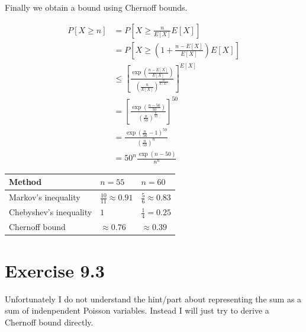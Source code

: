 \documentclass[10pt,a4paper]{article}
\begin{document}
Finally we obtain a bound using Chernoff bounds.

\begin{align*}
  P[X \ge n] & = P[X \ge \frac{n}{E[X]}E[X]]\\
             & = P[X \ge \left( 1 + \frac{n - E[X]}{E[X]} \right)E[X]]\\
             & \le \left[ \frac{\exp\left( \frac{n - E[X]}{E[X]} \right)}{\left( \frac{n}{E[X]} \right)^{\frac{n}{E[X]}}} \right]^{E[X]}\\
             & = \left[ \frac{\exp\left( \frac{n - 50}{50} \right)}{\left( \frac{n}{50} \right)^{\frac{n}{50}}} \right]^{50}\\
             & = \frac{\exp\left( \frac{n}{50} - 1 \right)^{50}}{\left( \frac{n}{50} \right)^{n}}\\
             & = 50^{n} \frac{\exp\left( n - 50 \right)}{n^{n}}
\end{align*}

\begin{tabular}{lll}
Method & $n = 55$ & $n = 60$\\
\hline
Markov's inequality & $\frac{10}{11} \approx 0.91$ & $\frac{5}{6} \approx 0.83$\\
Chebyshev's inequality & $1$ & $\frac{1}{4} = 0.25$\\
Chernoff bound & $\approx 0.76$ & $\approx 0.39$\\
\end{tabular}

\section*{Exercise 9.3}

Unfortunately I do not understand the hint/part about representing the sum as a sum of indenpendent Poisson variables.
Instead I will just try to derive a Chernoff bound directly.
\end{document}
